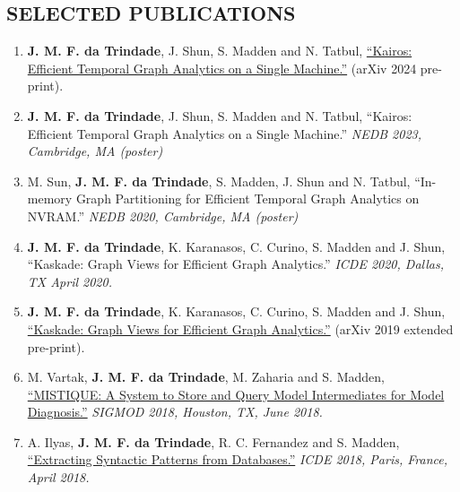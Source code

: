 \documentclass[centered,overlapped]{res}
\begin{document}
\begin{resume}
\section{SELECTED PUBLICATIONS}
\begin{enumerate}
  \item \textbf{J. M. F. da Trindade}, J. Shun, S. Madden and N. Tatbul, \href{https://arxiv.org/abs/2401.02563}{``Kairos: Efficient Temporal Graph Analytics on a Single Machine.''} (arXiv 2024 pre-print).
  \item \textbf{J. M. F. da Trindade}, J. Shun, S. Madden and N. Tatbul, ``Kairos: Efficient Temporal Graph Analytics on a Single Machine.'' \textit{NEDB 2023, Cambridge, MA (poster)}
  \item M. Sun, \textbf{J. M. F. da Trindade}, S. Madden, J. Shun and N. Tatbul, ``In-memory Graph Partitioning for Efficient Temporal Graph Analytics on NVRAM.''  \textit{NEDB 2020, Cambridge, MA (poster)}
  \item \textbf{J. M. F. da Trindade}, K. Karanasos, C. Curino, S. Madden and J. Shun, ``Kaskade: Graph Views for Efficient Graph Analytics.'' \textit{ICDE 2020, Dallas, TX April 2020.}
  \item \textbf{J. M. F. da Trindade}, K. Karanasos, C. Curino, S. Madden and J. Shun, \href{https://arxiv.org/abs/1906.05162}{``Kaskade: Graph Views for Efficient Graph Analytics.''} (arXiv 2019 extended pre-print).
  \item M. Vartak, \textbf{J. M. F. da Trindade}, M. Zaharia and S. Madden, \href{https://cs.stanford.edu/~matei/papers/2018/sigmod_mistique.pdf}{``MISTIQUE: A System to Store and Query Model Intermediates for Model Diagnosis.''} \textit{SIGMOD 2018, Houston, TX, June 2018.}
  \item A. Ilyas, \textbf{J. M. F. da Trindade}, R. C. Fernandez and S. Madden, \href{https://arxiv.org/pdf/1710.11528.pdf}{``Extracting Syntactic Patterns from Databases.''} \textit{ICDE 2018, Paris, France, April 2018.}

\end{enumerate}
\end{resume}
\end{document}
